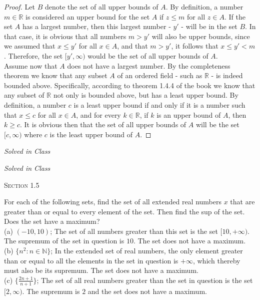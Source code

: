 \documentclass[12pt]{article}
\newenvironment{exercise}[2][Exercise]{\begin{trivlist}
\item[\hskip \labelsep {\bfseries #1}\hskip \labelsep {\bfseries #2.}]}{\end{trivlist}}
\begin{document}
\begin{proof}
Let $B$ denote the set of all upper bounds of $A$. By definition, a number $m \in \mathbb{R}$ is considered an upper bound for the set $A$ if $z \leq m$ for all $z \in A$. If the set $A$ has a largest number, then this largest number - $y'$ - will be in the set $B$. In that case, it is obvious that all numbers $m > y'$ will also be upper bounds, since we assumed that $x \leq y'$ for all $x \in A$, and that $m > y'$, it follows that $x \leq y' < m$. Therefore, the set $[y', \infty)$ would be the set of all upper bounds of $A$. \\
Assume now that $A$ does not have a largest number. By the completeness theorem we know that any subset $A$ of an ordered field - such as $\mathbb{R}$ - is indeed bounded above. Specifically, according to theorem 1.4.4 of the book we know that any subset of $\mathbb{R}$ not only is bounded above, but has a least upper bound. By definition, a number $c$ is a least upper bound if and only if it is a number such that $x \leq c$ for all $x \in A$, and for every $k \in \mathbb{R}$, if $k$ is an upper bound of $A$, then $k \geq c$. It is obvious then that the set of all upper bounds of $A$ will be the set $[c, \infty)$ where $c$ is the least upper bound of $A$.
\end{proof}


\begin{exercise}{1.4.4}
\emph{Solved in Class}
\end{exercise}

\begin{exercise}{1.4.7}
\emph{Solved in Class}
\end{exercise}

\begin{center}
\textsc{\Large Section 1.5}
\end{center}

\begin{exercise}{1.5.1}
For each of the following sets, find the set of all extended real numbers $x$ that are greater than or equal to every element of the set. Then find the sup of the set. Does the set have a maximum? \\
(a) $(-10, 10)$; The set of all numbers greater than this set is the set $[10, +\infty)$. The supremum of the set in question is $10$. The set does not have a maximum.\\
(b) $\{n^2 : n \in \mathbb{N}\}$; In the extended set of real numbers, the only element greater than or equal to all the elements in the set in question is $+\infty$, which thereby must also be its supremum. The set does not have a maximum.\\
(c) $\{ \frac{2n+1}{n+1}\}$; The set of all real numbers greater than the set in question is the set $[2,\infty)$. The supremum is $2$ and the set does not have a maximum.
\end{exercise}
\end{document}
